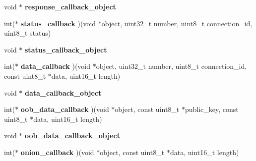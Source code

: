 \begin{DoxyCompactItemize}
\item 
\hypertarget{struct_t_c_p___client___connection_a60ca473249fab46aefe6f89158bd5a52}{void $\ast$ {\bfseries response\+\_\+callback\+\_\+object}}\label{struct_t_c_p___client___connection_a60ca473249fab46aefe6f89158bd5a52}

\item 
\hypertarget{struct_t_c_p___client___connection_a8c56af2094f8d2846998b395dbcaef18}{int($\ast$ {\bfseries status\+\_\+callback} )(void $\ast$object, uint32\+\_\+t number, uint8\+\_\+t connection\+\_\+id, uint8\+\_\+t status)}\label{struct_t_c_p___client___connection_a8c56af2094f8d2846998b395dbcaef18}

\item 
\hypertarget{struct_t_c_p___client___connection_a73f125475af5ebdac27d2c2a9060039b}{void $\ast$ {\bfseries status\+\_\+callback\+\_\+object}}\label{struct_t_c_p___client___connection_a73f125475af5ebdac27d2c2a9060039b}

\item 
\hypertarget{struct_t_c_p___client___connection_a2da80454e9a05921b2c6616ffb021eec}{int($\ast$ {\bfseries data\+\_\+callback} )(void $\ast$object, uint32\+\_\+t number, uint8\+\_\+t connection\+\_\+id, const uint8\+\_\+t $\ast$data, uint16\+\_\+t length)}\label{struct_t_c_p___client___connection_a2da80454e9a05921b2c6616ffb021eec}

\item 
\hypertarget{struct_t_c_p___client___connection_a9135a1782241a1b2d5e9bcedef0c29a5}{void $\ast$ {\bfseries data\+\_\+callback\+\_\+object}}\label{struct_t_c_p___client___connection_a9135a1782241a1b2d5e9bcedef0c29a5}

\item 
\hypertarget{struct_t_c_p___client___connection_a3f8394ec4439b5730e80f10d6951b845}{int($\ast$ {\bfseries oob\+\_\+data\+\_\+callback} )(void $\ast$object, const uint8\+\_\+t $\ast$public\+\_\+key, const uint8\+\_\+t $\ast$data, uint16\+\_\+t length)}\label{struct_t_c_p___client___connection_a3f8394ec4439b5730e80f10d6951b845}

\item 
\hypertarget{struct_t_c_p___client___connection_a3bd56ba2917797a0eea802a7192ef031}{void $\ast$ {\bfseries oob\+\_\+data\+\_\+callback\+\_\+object}}\label{struct_t_c_p___client___connection_a3bd56ba2917797a0eea802a7192ef031}

\item 
\hypertarget{struct_t_c_p___client___connection_ab6dd4883cc217ef4c036cb404f036a47}{int($\ast$ {\bfseries onion\+\_\+callback} )(void $\ast$object, const uint8\+\_\+t $\ast$data, uint16\+\_\+t length)}\label{struct_t_c_p___client___connection_ab6dd4883cc217ef4c036cb404f036a47}


\end{DoxyCompactItemize}
